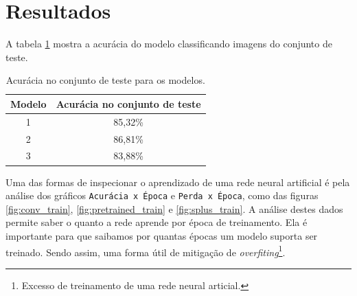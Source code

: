 \section{Resultados}

A tabela \ref{tab:eval} mostra a acurácia do modelo classificando imagens do conjunto de teste.

\begin{table}[h!]
  \centering

  \caption{Acurácia no conjunto de teste para os modelos.}
  \label{tab:eval}

  \begin{tabular}{cc}
    \toprule
    Modelo & Acurácia no conjunto de teste \\
    \midrule
    1      & 85,32\%                       \\
    2      & 86,81\%                       \\
    3      & 83,88\%                       \\
    \bottomrule
  \end{tabular}
\end{table}


Uma das formas de inspecionar o aprendizado de uma rede neural artificial é pela análise dos gráficos \texttt{Acurácia x Época} e \texttt{Perda x Época}, como das figuras \ref{fig:conv_train}, \ref{fig:pretrained_train} e \ref{fig:splus_train}. A análise destes dados permite saber o quanto a rede aprende por época de treinamento. Ela é importante para que saibamos por quantas épocas um modelo suporta ser treinado. Sendo assim, uma forma útil de mitigação de \emph{overfiting}\footnote{Excesso de treinamento de uma rede neural articial.}.



\pagebreak

